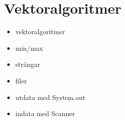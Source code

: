 \chapter{Vektoralgoritmer}
\begin{itemize}[nosep]
\item vektoralgoritmer
\item min/max
\item strängar
\item filer
\item utdata med System.out
\item indata med Scanner\end{itemize}